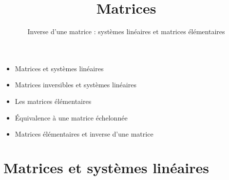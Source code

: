 







\title{{\bf Matrices}}
\subtitle{Inverse d'une matrice : systèmes linéaires et matrices élémentaires}

\begin{frame}
  
  \debutmontitre

  \pause

{\footnotesize
\hfill
{}
\begin{minipage}{0.6\textwidth}
  \begin{itemize}
    \item<3-> Matrices et systèmes linéaires
    \item<4-> Matrices inversibles et systèmes linéaires
    \item<5-> Les matrices élémentaires
    \item<6-> \'Equivalence à une matrice échelonnée
    \item<7-> Matrices élémentaires et inverse d'une matrice   
  \end{itemize}
\end{minipage}
}

\end{frame}

\setcounter{framenumber}{0}


\section{Matrices et systèmes linéaires}

